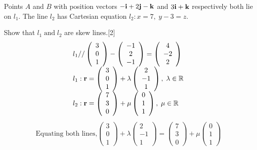 \documentclass[12pt, a4 paper]{article}
\begin{document}
\begin{outline}[enumerate]
					\color{black}
					\1 Points $A$ and $B$ with position vectors $ - {\bf{i}} + 2{\bf{j}} - {\bf{k}}$ and $3{\bf{i}} + {\bf{k}}$ respectively both lie on ${l_1}$. The line ${l_2}$ has Cartesian equation ${l_2}:x = 7,\;y - 3 = z$.

					\2 Show that ${l_1}\;{\textrm{and}}\;{l_2}$ are skew lines.\hfill[2]
					\color{blue}
					\[\begin{array}{l}{l_1}{\textrm{//}}\left( {\begin{array}{*{20}{c}}3\\0\\1\end{array}} \right) - \left( {\begin{array}{*{20}{c}}{ - 1}\\2\\{ - 1}\end{array}} \right) = \left( {\begin{array}{*{20}{c}}4\\{ - 2}\\2\end{array}} \right)\\{l_1}:{\bf{r}} = \left( {\begin{array}{*{20}{c}}3\\0\\1\end{array}} \right) + \lambda \left( {\begin{array}{*{20}{c}}2\\{ - 1}\\1\end{array}} \right),\;\lambda  \in \mathbb{R}\\{l_2}:{\bf{r}} = \left( {\begin{array}{*{20}{c}}7\\3\\0\end{array}} \right) + \mu \left( {\begin{array}{*{20}{c}}0\\1\\1\end{array}} \right),\;\mu  \in \mathbb{R}\end{array}\]
					\[\begin{array}{l}{\textrm{Equating both lines,}}\left( {\begin{array}{*{20}{c}}3\\0\\1\end{array}} \right) + \lambda \left( {\begin{array}{*{20}{c}}2\\{ - 1}\\1\end{array}} \right) = \left( {\begin{array}{*{20}{c}}7\\3\\0\end{array}} \right) + \mu \left( {\begin{array}{*{20}{c}}0\\1\\1\end{array}} \right)\end{array}\]

\end{outline}
\end{document}
